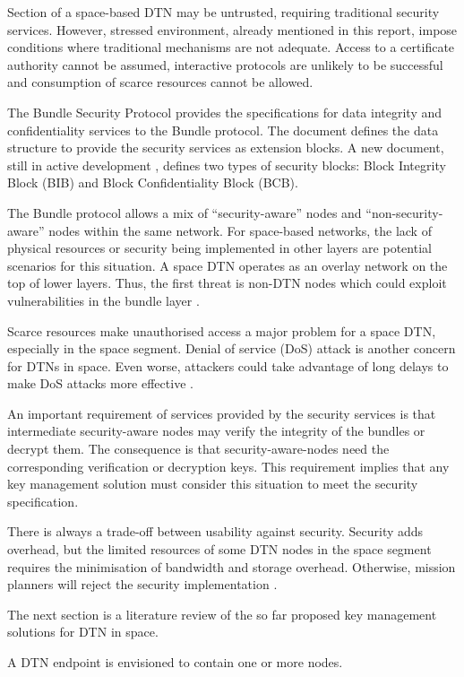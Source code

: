 Section of a space-based DTN may be untrusted, requiring traditional security services. However, stressed environment, already mentioned in this report, impose conditions where traditional mechanisms are not adequate. Access to a certificate authority cannot be assumed, interactive protocols are unlikely to be successful and consumption of scarce resources cannot be allowed. 
 
 The Bundle Security Protocol \cite{rfc6257} provides the specifications for data integrity and confidentiality services to the Bundle protocol. The document defines the data structure to provide the security services as extension blocks. A new document, still in active development \cite{ietf-dtn-bpsec-07}, defines two types of security blocks: Block Integrity Block (BIB) and Block Confidentiality Block (BCB).  
 
 
 
 The Bundle protocol allows a mix of ``security-aware'' nodes and ``non-security-aware'' nodes within the same network. For space-based networks, the lack of physical resources or security being implemented in other layers are potential scenarios for this situation. A space DTN operates as an overlay network on the top of lower layers. Thus, the first threat is non-DTN nodes which could exploit vulnerabilities in the bundle layer \cite{rfc6257}.
 
Scarce resources make unauthorised access a major problem for a space DTN, especially in the space segment. Denial of service (DoS) attack is another concern for DTNs in space. Even worse, attackers could take advantage of long delays to make DoS attacks more effective \cite{rfc6257}. 

 

An important requirement of services provided by the security services is that intermediate security-aware nodes may verify the integrity of the bundles or decrypt them. The consequence is that security-aware-nodes need the corresponding verification or decryption keys. This requirement implies that any key management solution must consider this situation to meet the security specification. 

There is always a trade-off between usability against security. Security adds overhead, but the limited resources of some DTN nodes in the space segment requires the minimisation of bandwidth and storage overhead. Otherwise, mission planners will reject the security implementation \cite{book2012architecture}.


The next section is a literature review of the so far proposed key management solutions for DTN in space.


A DTN endpoint is envisioned to contain one or more nodes.








